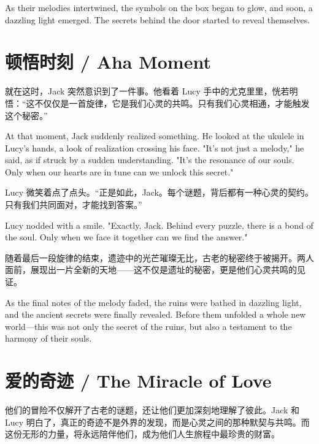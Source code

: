 \begin{flushright} As their melodies intertwined, the symbols on the box began to glow, and soon, a dazzling light emerged. The secrets behind the door started to reveal themselves. \end{flushright}

\section*{顿悟时刻 / Aha Moment}

就在这时，Jack 突然意识到了一件事。他看着 Lucy 手中的尤克里里，恍若明悟：“这不仅仅是一首旋律，它是我们心灵的共鸣。只有我们心灵相通，才能触发这个秘密。”

\begin{flushright}
At that moment, Jack suddenly realized something. He looked at the ukulele in Lucy's hands, a look of realization crossing his face. "It's not just a melody," he said, as if struck by a sudden understanding. "It's the resonance of our souls. Only when our hearts are in tune can we unlock this secret."
\end{flushright}

Lucy 微笑着点了点头。“正是如此，Jack。每个谜题，背后都有一种心灵的契约。只有我们共同面对，才能找到答案。”

\begin{flushright}
Lucy nodded with a smile. "Exactly, Jack. Behind every puzzle, there is a bond of the soul. Only when we face it together can we find the answer."
\end{flushright}

随着最后一段旋律的结束，遗迹中的光芒璀璨无比，古老的秘密终于被揭开。两人面前，展现出一片全新的天地——这不仅是遗址的秘密，更是他们心灵共鸣的见证。

\begin{flushright}
As the final notes of the melody faded, the ruins were bathed in dazzling light, and the ancient secrets were finally revealed. Before them unfolded a whole new world—this was not only the secret of the ruins, but also a testament to the harmony of their souls.
\end{flushright}

\section*{爱的奇迹 / The Miracle of Love}

他们的冒险不仅解开了古老的谜题，还让他们更加深刻地理解了彼此。Jack 和 Lucy 明白了，真正的奇迹不是外界的发现，而是心灵之间的那种默契与共鸣。而这份无形的力量，将永远陪伴他们，成为他们人生旅程中最珍贵的财富。

